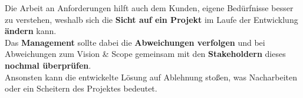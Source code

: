 \noindent
Die Arbeit an Anforderungen hilft auch dem Kunden, eigene Bedürfnisse besser zu verstehen, weshalb sich die \textbf{Sicht auf ein Projekt} im Laufe der Entwicklung \textbf{ändern} kann.\\
Das \textbf{Management} sollte dabei die \textbf{Abweichungen verfolgen} und bei Abweichungen zum Vision \& Scope gemeinsam mit den \textbf{Stakeholdern} dieses \textbf{nochmal überprüfen}.\\
Ansonsten kann die entwickelte Lösung auf Ablehnung stoßen, was Nacharbeiten oder ein Scheitern des Projektes bedeutet.